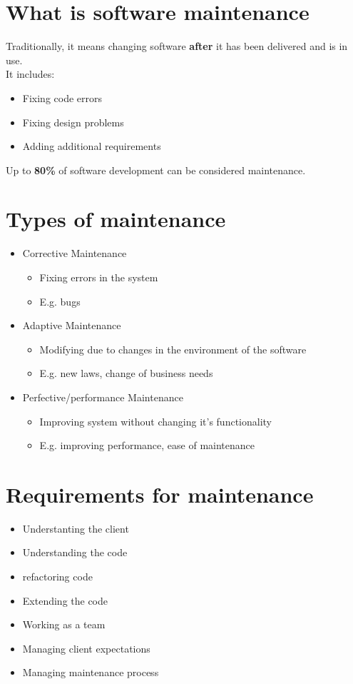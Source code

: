 \documentclass{article}
\begin{document}
\section{What is software maintenance}
\begin{flushleft}
	Traditionally, it means changing software \textbf{after} it has been delivered and is in use.\\
It includes:
\begin{itemize}
	\item Fixing code errors
	\item Fixing design problems
	\item Adding additional requirements
\end{itemize}
Up to \textbf{80\%} of software development can be considered maintenance.
\end{flushleft}

\section{Types of maintenance}
\begin{flushleft}
\begin{itemize}
	\item Corrective Maintenance
	\begin{itemize}
		\item Fixing errors in the system
		\item E.g. bugs
	\end{itemize}
	\item Adaptive Maintenance
	\begin{itemize}
		\item Modifying due to changes in the environment of the software
		\item E.g. new laws, change of business needs
	\end{itemize}
	\item Perfective/performance Maintenance
	\begin{itemize}
		\item Improving system without changing it's functionality
		\item E.g. improving performance, ease of maintenance
	\end{itemize}
\end{itemize}
\end{flushleft}

\section{Requirements for maintenance}
\begin{itemize}
	\item Understanting the client
	\item Understanding the code
	\item refactoring code
	\item Extending the code
	\item Working as a team
	\item Managing client expectations
	\item Managing maintenance process
\end{itemize}
\end{document}

